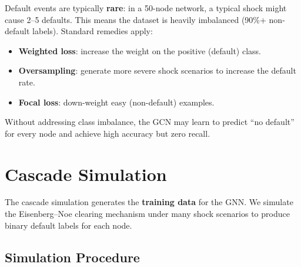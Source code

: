 \documentclass[11pt, a4paper]{article}
\theoremstyle{definition}
\theoremstyle{plain}
\theoremstyle{remark}
\begin{document}
\begin{warningbox}
Default events are typically \textbf{rare}: in a 50-node network, a typical shock
might cause 2--5 defaults.
This means the dataset is heavily imbalanced (90\%+ non-default labels).
Standard remedies apply:
\begin{itemize}
    \item \textbf{Weighted loss}: increase the weight on the positive (default) class.
    \item \textbf{Oversampling}: generate more severe shock scenarios to increase
          the default rate.
    \item \textbf{Focal loss}: down-weight easy (non-default) examples.
\end{itemize}
Without addressing class imbalance, the GCN may learn to predict ``no default''
for every node and achieve high accuracy but zero recall.
\end{warningbox}

\section{Cascade Simulation}
\label{sec:cascade}

The cascade simulation generates the \textbf{training data} for the GNN\@.
We simulate the Eisenberg--Noe clearing mechanism under many shock scenarios
to produce binary default labels for each node.

\subsection{Simulation Procedure}
\end{document}
